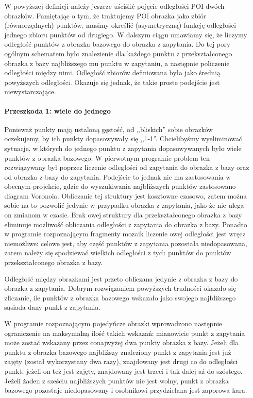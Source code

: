 \documentclass[a4paper,12pt,leqno]{article}
\begin{document}
W powyższej definicji należy jeszcze uściślić pojęcie odległości POI dwóch obrazków. Pamiętając o tym, że traktujemy POI obrazka jako zbiór (równorzędnych) punktów, 
musimy określić (asymetryczną) funkcję odległości jednego zbioru punktów od drugiego. W dalszym ciągu umawiamy się, że liczymy odległość punktów z obrazka bazowego do obrazka z zapytania.
Do tej pory ogólnym schematem było znalezienie dla każdego punktu z przekształconego obrazka z bazy najbliższego mu punktu w zapytaniu, a następnie policzenie odległości między nimi.
Odległość zbiorów definiowana była jako średnią powyższych odległości. Okazuje się jednak, że takie proste podejście jest niewystarczające.

\paragraph{Przeszkoda 1: wiele do jednego}
Ponieważ punkty mają ustaloną gęstość, od ,,bliskich'' sobie obrazków oczekujemy, by ich punkty dopasowywały się ,,1-1''. 
Chcielibyśmy wyeliminować sytuacje, w których do jednego punktu z zapytania dopasowywanych było wiele punktów z obrazka bazowego.
W pierwotnym programie problem ten rozwiązywany był poprzez liczenie odległości od zapytania do obrazka z bazy oraz od obrazka z bazy do zapytania.
Podejście to jednak nie ma zastosowania w obecnym projekcie, gdzie do wyszukiwania najbliższych punktów zastosowano diagram Voronoia. Obliczanie tej struktury
jest kosztowne czasowo, zatem można sobie na to pozwolić jedynie w przypadku obrazka z zapytania, jako że nie ulega on zmianom w czasie. Brak owej struktury dla
przekształconego obrazka z bazy eliminuje możliwość obliczania odległości z zapytania do obrazka z bazy. Ponadto w programie rozpoznającym fragmenty mozaik liczenie
owej odległości jest wręcz niemożliwe: celowe jest, aby część punktów z zapytania pozostała niedopasowana, zatem należy się spodziewać wielkich odległości z tych
punktów do punktów przekształconego obrazka z bazy.

Odległość między obrazkami jest przeto obliczana jedynie z obrazka z bazy do obrazka z zapytania. Dobrym rozwiązaniem powyższych trudności okazało się zliczanie,
ile punktów z obrazka bazowego wskazało jako swojego najbliższego sąsiada dany punkt z zapytania.

W programie rozpoznającym pojedyńcze obrazki wprowadzono następnie ograniczenie na maksymalną ilość takich wskazań: mianowicie punkt z zapytania może zostać
wskazany przez conajwyżej dwa punkty obrazka z bazy. Jeżeli dla punktu z obrazka bazowego najbliższy znaleziony punkt z zapytania jest już zajęty (został
wykorzystany dwa razy), znajdowany jest drugi co do odległości punkt, jeżeli on też jest zajęty, znajdowany jest trzeci i tak dalej aż do szóstego. Jeżeli
żaden z sześciu najbliższych punktów nie jest wolny, punkt z obrazka bazowego pozostaje niedopasowany i osobnikowi przydzielana jest zaporowa kara.
\end{document}
